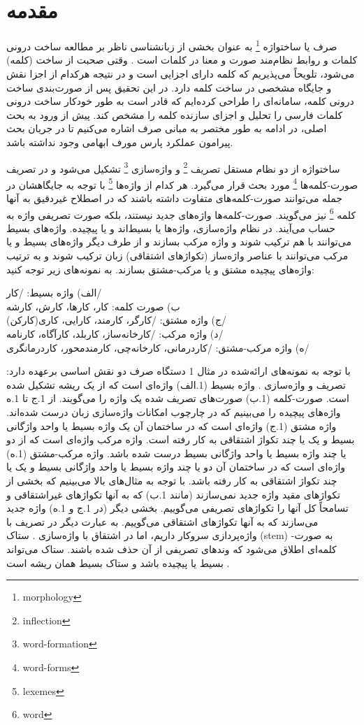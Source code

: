 \documentclass[12pt,onecolumn,a4paper]{article}
\begin{document}
    \section{مقدمه}
    صرف یا ساختواژه \footnote{morphology} به عنوان بخشی از زبان‏شناسی ناظر بر مطالعه ساخت درونی کلمات و روابط نظام‌مند صورت و معنا در کلمات است  . وقتی صحبت از ساخت (کلمه) می‌شود، تلویحاً می‌پذیریم که کلمه دارای اجزایی است و در نتیجه هرکدام از اجزا نقش و جایگاه مشخصی در ساخت کلمه دارد. در این تحقیق پس از صورت‌بندی ساخت درونی کلمه، سامانه‌ای را طراحی کرده‌ایم که قادر است به طور خودکار ساخت درونی کلمات فارسی را تحلیل و اجزای سازنده کلمه را مشخص کند. پیش از ورود به بحث اصلی، در ادامه به طور مختصر به مبانی صرف اشاره می‌کنیم تا در جریان بحث پیرامون عملکرد پارس مورف ابهامی وجود نداشته باشد.
    \par\noindent
    ساختواژه از دو نظام مستقل تصریف \footnote{inflection} و واژه‌سازی \footnote{word-formation} تشکیل می‌شود و در تصریف صورت-کلمه‌ها \footnote{word-forms} مورد بحث قرار می‌گیرد. هر کدام از واژه‌ها \footnote{lexemes} با توجه به جایگاهشان در جمله می‌توانند صورت-کلمه‌های متفاوت داشته باشند که در اصطلاح غیردقیق به آنها کلمه \footnote{word} نیز می‌گویند. صورت-کلمه‌ها واژه‌های جدید نیستند، بلکه صورت تصریفی واژه‌ به حساب می‌آیند. در نظام واژه‌سازی، واژه‌ها یا بسیط‌اند و یا پیچیده. واژه‌های بسیط می‌توانند با هم ترکیب شوند و واژه مرکب بسازند و از طرف دیگر واژه‌های بسیط و یا مرکب می‌توانند با عناصر واژه‌ساز (تکواژهای اشتقاقی) زبان ترکیب شوند و به ترتیب واژه‌های پیچیده مشتق و یا مرکب-مشتق بسازند. به نمونه‌های زیر توجه کنید:
    \par\noindent
    الف) واژه بسیط: /کار/ \\
    ب) صورت کلمه: کار، کارها، کارش، کارشه \\
    ج) واژه مشتق: /کارگر، کارمند، کارایی، کاری(کارکن)/ \\
    د) واژه مرکب: /کارخانه‌ساز، کاربلد، کارآگاه، کارنامه/ \\
    ه) واژه مرکب-مشتق: /کاردرمانی، کارخانه‌چی، کارمندمحور، کاردرمانگری/ \\
    \par\noindent
    با توجه به نمونه‌های ارائه‌شده در مثال 1 دستگاه صرف دو نقش اساسی برعهده دارد: تصریف و واژه‌‌سازی {\mfo\citep{Taba82}}. واژه بسیط (1.الف) واژه‌ای است که از یک ریشه تشکیل شده است. صورت-کلمه (1.ب) صورت‌های تصریف شده یک واژه را می‌گویند. از 1.ج تا 1.ه واژه‌های پیچیده را می‌بینیم که در چارچوب امکانات واژه‌سازی زبان درست شده‌اند. واژه مشتق (1.ج) واژه‌ای است که در ساختمان آن یک واژه بسیط یا واحد واژگانی بسیط و یک یا چند تکواژ اشتقاقی به کار رفته است. واژه مرکب واژه‌ای است که از دو یا چند واژه بسیط یا واحد واژگانی بسیط درست شده باشد. واژه مرکب-مشتق (1.ه) واژه‌ای است که در ساختمان آن دو یا چند واژه بسیط یا واحد واژگانی بسیط و یک یا چند تکواژ اشتقاقی به کار رفته باشد. با توجه به مثال‌های بالا می‌بینیم که بخشی از تکواژهای مقید واژه جدید نمی‌سازند (مانند 1.ب) که به آنها تکواژهای غیراشتقاقی و تسامحاً کل آنها را تکواژهای تصریفی می‌گوییم. بخشی دیگر (در 1.ج و 1.ه) واژه جدید می‌سازند که به آنها تکواژهای اشتقاقی می‌گوییم. به عبارت دیگر در تصریف با واژه‌پردازی سروکار داریم، اما در اشتقاق با واژه‌سازی {\mfo\citep{Taba76}}. ستاک (stem) به صورت-کلمه‌ای اطلاق می‌شود که وندهای تصریفی از آن حذف شده باشند. ستاک می‌تواند بسیط یا پیچیده باشد و ستاک بسیط همان ریشه است .
\end{document}
